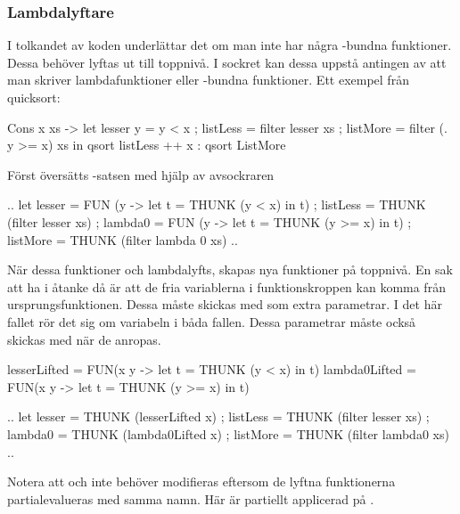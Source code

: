\documentclass[../Core]{subfiles}
\begin{document}
\subsubsection{Lambdalyftare}
\label{sec:LamLift}

I tolkandet av koden underlättar det om man inte har några -bundna funktioner.
Dessa behöver lyftas ut till toppnivå. I sockret kan dessa uppstå antingen
av att man skriver lambdafunktioner eller -bundna funktioner. Ett exempel
från quicksort:

\begin{codeEx}
  Cons x xs ->
      let { lesser y = y < x
          ; listLess = filter lesser xs
          ; listMore = filter (\y . y >= x) xs
          }
      in  qsort listLess ++ x : qsort ListMore
\end{codeEx}

Först översätts -satsen med hjälp av avsockraren

\begin{codeEx}
  .. let { lesser = FUN (y -> let t = THUNK (y < x) in t)
         ; listLess = THUNK (filter lesser xs)
         ; lambda0 = FUN (y -> let t = THUNK (y >= x) in t)
         ; listMore = THUNK (filter lambda 0 xs)
         } ..
\end{codeEx}
      
När dessa funktioner  och  lambdalyfts, skapas nya funktioner
på toppnivå. En sak att ha i åtanke då är att de fria variablerna i funktionskroppen 
kan komma från ursprungsfunktionen. Dessa måste skickas med
som extra parametrar. I det här fallet rör det sig om variabeln  i båda fallen.
Dessa parametrar måste också skickas med när de anropas.
\begin{codeEx}
lesserLifted  = FUN(x y -> let t = THUNK (y <  x) in t)
lambda0Lifted = FUN(x y -> let t = THUNK (y >= x) in t)

    .. let { lesser   = THUNK (lesserLifted   x)
           ; listLess = THUNK (filter lesser  xs)
           ; lambda0  = THUNK (lambda0Lifted  x)
           ; listMore = THUNK (filter lambda0 xs)
           } ..
\end{codeEx}

Notera att  och  
inte behöver modifieras eftersom de lyftna funktionerna partialevalueras 
med samma namn. Här är  
partiellt applicerad på .
\end{document}
